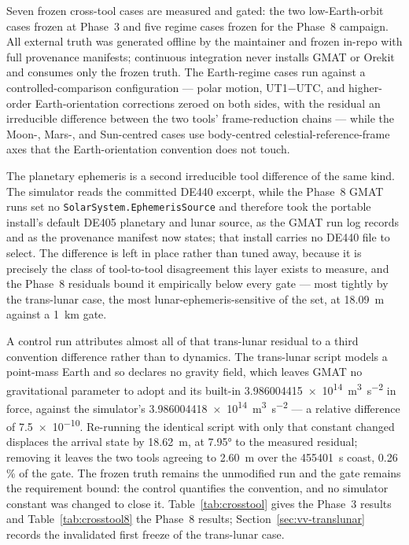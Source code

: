 \documentclass[10pt]{article}
\begin{document}
Seven frozen cross-tool cases are measured and gated: the two low-Earth-orbit
cases frozen at Phase~3 and five regime cases frozen for the Phase~8 campaign.
All external truth was generated offline by the maintainer and frozen in-repo
with full provenance manifests; continuous integration never installs GMAT or
Orekit and consumes only the frozen truth. The Earth-regime cases run against a
controlled-comparison configuration --- polar motion, UT1$-$UTC, and
higher-order Earth-orientation corrections zeroed on both sides, with the
residual an irreducible difference between the two tools' frame-reduction
chains --- while the Moon-, Mars-, and Sun-centred cases use body-centred
celestial-reference-frame axes that the Earth-orientation convention does not
touch.

The planetary ephemeris is a second irreducible tool difference of the same
kind. The simulator reads the committed DE440 excerpt, while the Phase~8 GMAT
runs set no \texttt{SolarSystem.EphemerisSource} and therefore took the
portable install's default DE405 planetary and lunar source, as the GMAT run
log records and as the provenance manifest now states; that install carries no
DE440 file to select. The difference is left in place rather than tuned away,
because it is precisely the class of tool-to-tool disagreement this layer
exists to measure, and the Phase~8 residuals bound it empirically below every
gate --- most tightly by the trans-lunar case, the most
lunar-ephemeris-sensitive of the set, at \SI{18.09}{\meter} against a
\SI{1}{\kilo\meter} gate.

A control run attributes almost all of that trans-lunar residual to a third
convention difference rather than to dynamics. The trans-lunar script models a
point-mass Earth and so declares no gravity field, which leaves GMAT no
gravitational parameter to adopt and its built-in
\SI{3.986004415e14}{\meter\cubed\per\second\squared} in force, against the
simulator's \SI{3.986004418e14}{\meter\cubed\per\second\squared} --- a relative
difference of \num{7.5e-10}. Re-running the identical script with only that
constant changed displaces the arrival state by \SI{18.62}{\meter}, at
\ang{7.95} to the measured residual; removing it leaves the two tools agreeing
to \SI{2.60}{\meter} over the \SI{455401}{\second} coast, \num{0.26}\,\% of the
gate. The frozen truth remains the unmodified run and the gate remains the
requirement bound: the control quantifies the convention, and no simulator
constant was changed to close it. Table~\ref{tab:crosstool} gives the Phase~3 results
and Table~\ref{tab:crosstool8} the Phase~8 results;
Section~\ref{sec:vv-translunar} records the invalidated first freeze of the
trans-lunar case.
\end{document}
